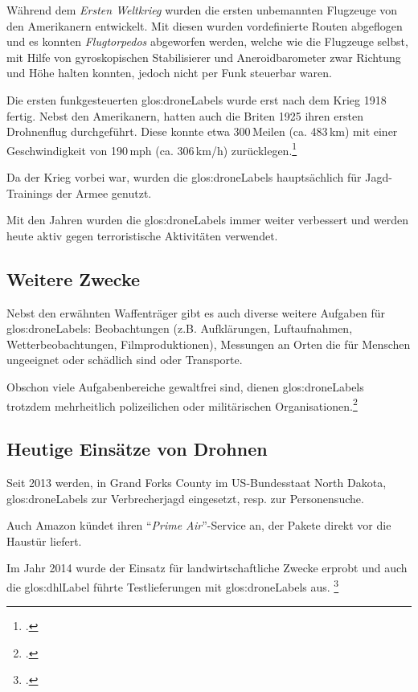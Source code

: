 Während dem \textit{Ersten Weltkrieg} wurden die ersten unbemannten Flugzeuge von den Amerikanern entwickelt.
Mit diesen wurden vordefinierte Routen abgeflogen und es konnten \textit{Flugtorpedos} abgeworfen werden, welche wie die Flugzeuge selbst, mit Hilfe von gyroskopischen Stabilisierer und Aneroidbarometer zwar Richtung und Höhe halten konnten, jedoch nicht per Funk steuerbar waren.

Die ersten funkgesteuerten \glspl{glos:droneLabel} wurde erst nach dem Krieg 1918 fertig.
Nebst den Amerikanern, hatten auch die Briten 1925 ihren ersten Drohnenflug durchgeführt. Diese konnte etwa 300\,Meilen (ca. 483\,km) mit einer Geschwindigkeit von 190\,mph (ca. 306\,km/h) zurücklegen.\footcite{Informatik_und_Gesellschaft_2015-03-21}

Da der Krieg vorbei war, wurden die \glspl{glos:droneLabel} hauptsächlich für Jagd-Trainings der Armee genutzt.

Mit den Jahren wurden die \glspl{glos:droneLabel} immer weiter verbessert und werden heute aktiv gegen terroristische Aktivitäten verwendet.

\subsection{Weitere Zwecke}
Nebst den erwähnten Waffenträger gibt es auch diverse weitere Aufgaben für \glspl{glos:droneLabel}: Beobachtungen (z.B. Aufklärungen, Luftaufnahmen, Wetterbeobachtungen, Filmproduktionen), Messungen an Orten die für Menschen ungeeignet oder schädlich sind oder Transporte.

Obschon viele Aufgabenbereiche gewaltfrei sind, dienen \glspl{glos:droneLabel} trotzdem mehrheitlich polizeilichen oder militärischen Organisationen.\footcite{Die_Geschichte_der_Drohnen_DiePresse.com_2015-03-21}

\subsection{Heutige Einsätze von Drohnen}
Seit 2013 werden, in Grand Forks County im US-Bundesstaat North Dakota, \glspl{glos:droneLabel} zur Verbrecherjagd eingesetzt, resp. zur Personensuche.

Auch Amazon kündet ihren "`\textit{Prime Air}"'-Service an, der Pakete direkt vor die Haustür liefert.

Im Jahr 2014 wurde der Einsatz für landwirtschaftliche Zwecke erprobt und auch die \gls{glos:dhlLabel} führte Testlieferungen mit \glspl{glos:droneLabel} aus. \footcite{Kleine_Geschichte_der_Drohnen_-_Nachrichten_Print_-_WELT_KOMPAKT_-_Lifestyle_-_DIE_WELT_2015-03-21}


